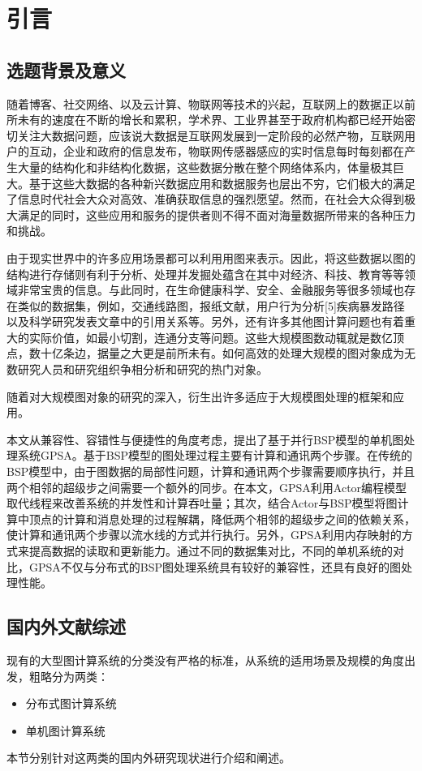 
\chapter{引言}
\section{选题背景及意义}

随着博客、社交网络、以及云计算、物联网等技术的兴起，互联网上的数据正以前所未有的速度在不断的增长和累积，学术界、工业界甚至于政府机构都已经开始密切关注大数据问题，应该说大数据是互联网发展到一定阶段的必然产物，互联网用户的互动，企业和政府的信息发布，物联网传感器感应的实时信息每时每刻都在产生大量的结构化和非结构化数据，这些数据分散在整个网络体系内，体量极其巨大。基于这些大数据的各种新兴数据应用和数据服务也层出不穷，它们极大的满足了信息时代社会大众对高效、准确获取信息的强烈愿望。然而，在社会大众得到极大满足的同时，这些应用和服务的提供者则不得不面对海量数据所带来的各种压力和挑战。

由于现实世界中的许多应用场景都可以利用用图来表示。因此，将这些数据以图的结构进行存储则有利于分析、处理并发掘处蕴含在其中对经济、科技、教育等等领域非常宝贵的信息。与此同时，在生命健康科学、安全、金融服务等很多领域也存在类似的数据集，例如，交通线路图，报纸文献，用户行为分析[5]疾病暴发路径以及科学研究发表文章中的引用关系等。另外，还有许多其他图计算问题也有着重大的实际价值，如最小切割，连通分支等问题。这些大规模图数动辄就是数亿顶点，数十亿条边，据量之大更是前所未有。如何高效的处理大规模的图对象成为无数研究人员和研究组织争相分析和研究的热门对象。

随着对大规模图对象的研究的深入，衍生出许多适应于大规模图处理的框架和应用。


本文从兼容性、容错性与便捷性的角度考虑，提出了基于并行BSP模型的单机图处理系统GPSA。基于BSP模型的图处理过程主要有计算和通讯两个步骤。在传统的BSP模型中，由于图数据的局部性问题，计算和通讯两个步骤需要顺序执行，并且两个相邻的超级步之间需要一个额外的同步。在本文，GPSA利用Actor编程模型取代线程来改善系统的并发性和计算吞吐量；其次，结合Actor与BSP模型将图计算中顶点的计算和消息处理的过程解耦，降低两个相邻的超级步之间的依赖关系，使计算和通讯两个步骤以流水线的方式并行执行。另外，GPSA利用内存映射的方式来提高数据的读取和更新能力。通过不同的数据集对比，不同的单机系统的对比，GPSA不仅与分布式的BSP图处理系统具有较好的兼容性，还具有良好的图处理性能。

\section{国内外文献综述}
现有的大型图计算系统的分类没有严格的标准，从系统的适用场景及规模的角度出发，粗略分为两类：
\begin{itemize}
\item 分布式图计算系统
\item 单机图计算系统
\end{itemize}
本节分别针对这两类的国内外研究现状进行介绍和阐述。

